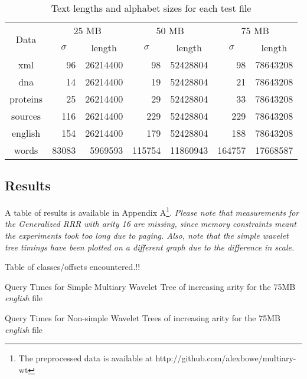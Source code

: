 \begin{center}
\begin{table}[h]
\begin{tabular}{crrrrrr}
\toprule
\multirow{2}{*}{Data} & \multicolumn{2}{c}{25 MB} & \multicolumn{2}{c}{50 MB} &  
	\multicolumn{2}{c}{75 MB}\\
		  \cmidrule(r){2-7}
	      &\multicolumn{1}{c}{$\sigma$}& \multicolumn{1}{c}{length}
		  &\multicolumn{1}{c}{$\sigma$}&\multicolumn{1}{c}{length}
		  &\multicolumn{1}{c}{$\sigma$}&\multicolumn{1}{c}{length}\\
\midrule
xml 	  & 96	   & 26214400 & 98 	   & 52428804 & 98 	   & 78643208 \\
dna 	  & 14     & 26214400 & 19 	   & 52428804 & 21     & 78643208 \\
proteins  & 25     & 26214400 & 29     & 52428804 & 33     & 78643208 \\
sources   & 116    & 26214400 & 229    & 52428804 & 229    & 78643208 \\
english   & 154    & 26214400 & 179    & 52428804 & 188    & 78643208 \\
words     & 83083  & 5969593  & 115754 & 11860943 & 164757 & 17668587 \\
\bottomrule
\end{tabular}
\caption{Text lengths and alphabet sizes for each test file}
\label{tab:files}
\end{table}
\end{center}

\subsection{Results}
A table of results is available in Appendix A\footnote{The preprocessed data is available at http://github.com/alexbowe/multiary-wt}. \emph{Please note that 
measurements for the Generalized RRR with arity 16 are missing, since memory 
constraints meant the experiments took too long due to paging. Also, note that
the simple wavelet tree timings have been plotted on a different graph due to
the difference in scale.}

Table of classes/offsets encountered.!!

			{Query Times for Simple Multiary Wavelet Tree of increasing arity
			for the 75MB \emph{english} file}
			
			{Query Times for Non-simple Wavelet Trees of increasing arity
			for the 75MB \emph{english} file}
			
